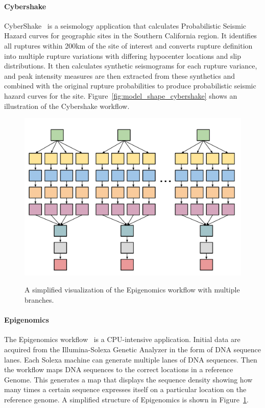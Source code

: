\paragraph{\textbf{Cybershake}}
CyberShake~\cite{Graves2010} is a seismology application that calculates Probabilistic Seismic Hazard curves for geographic sites in the Southern California region. It identifies all ruptures within 200km of the site of interest and converts rupture definition into multiple rupture variations with differing hypocenter locations and slip distributions. It then calculates synthetic seismograms for each rupture variance, and peak intensity measures are then extracted from these synthetics and combined with the original rupture probabilities to produce probabilistic seismic hazard curves for the site. Figure~\ref{fig:model_shape_cybershake} shows an illustration of the Cybershake workflow.

\begin{figure}[htb]
	\centering
	\includegraphics[width=0.7\linewidth]{figures/workflowsim/genome_shape.pdf} \\
	\caption{A simplified visualization of the Epigenomics workflow with multiple branches.}
	\label{fig:model_shape_genome}
\end{figure}

\paragraph{\textbf{Epigenomics}}
The Epigenomics workflow~\cite{Epigenome} is a CPU-intensive application. Initial data are acquired from the Illumina-Solexa Genetic Analyzer in the form of DNA sequence lanes. Each Solexa machine can generate multiple lanes of DNA sequences. Then the workflow maps DNA sequences to the correct locations in a reference Genome. This generates a map that displays the sequence density showing how many times a certain sequence expresses itself on a particular location on the reference genome. A simplified structure of Epigenomics is shown in Figure~\ref{fig:model_shape_genome}. 

